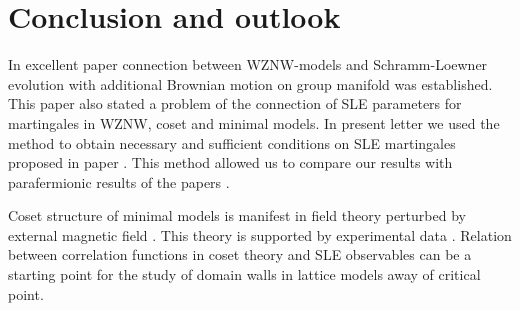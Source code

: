 \documentclass{jetpl}
\newcommand{\gf}{\mathfrak{g}}
\newcommand{\af}{\mathfrak{a}}
\begin{document}
\section{Conclusion and outlook}
\label{sec:outlook}

In excellent paper \cite{bettelheim2005stochastic} connection between WZNW-models and Schramm-Loewner evolution with additional Brownian motion on group manifold was established. This paper also stated a problem of the connection of SLE parameters for martingales in WZNW, coset and minimal models. In present letter we used the method to obtain necessary and sufficient conditions on SLE martingales proposed in paper \cite{alekseev2010sle}. This method allowed us to compare our results with parafermionic results of the papers \cite{santachiara2008sle,picco2008numerical}.

Coset structure of minimal models is manifest in field theory perturbed by external magnetic field \cite{fateev1990conformal,eguchi1989deformations,hollowood1989rational}. This theory is supported by experimental data \cite{coldea2010quantum}. Relation between correlation functions in coset theory and SLE observables can be a starting point for the study of domain walls in lattice models away of critical point. 
\end{document}
